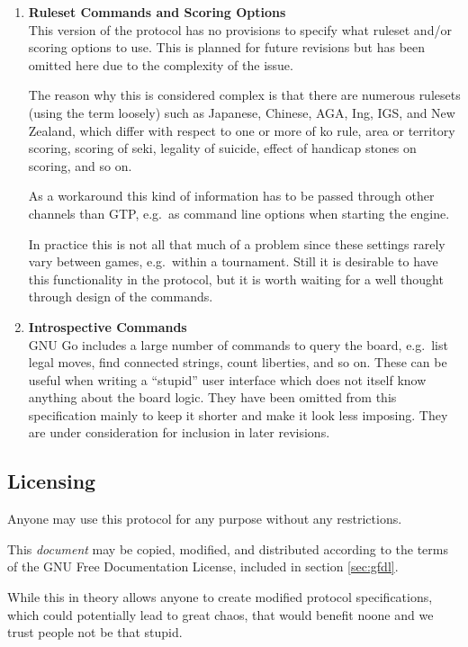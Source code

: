 \documentclass[a4paper]{article}
\begin{document}
\begin{enumerate}
\item \textbf{Ruleset Commands and Scoring Options} \\
  This version of the protocol has no provisions to specify what
  ruleset and/or scoring options to use. This is planned for future
  revisions but has been omitted here due to the complexity of the
  issue.

  The reason why this is considered complex is that there are numerous
  rulesets (using the term loosely) such as Japanese, Chinese, AGA,
  Ing, IGS, and New Zealand, which differ with respect to one or more
  of ko rule, area or territory scoring, scoring of seki, legality of
  suicide, effect of handicap stones on scoring, and so on.
  
  As a workaround this kind of information has to be passed through
  other channels than GTP, e.g.\ as command line options when starting
  the engine.

  In practice this is not all that much of a problem since these
  settings rarely vary between games, e.g.\ within a tournament. Still
  it is desirable to have this functionality in the protocol, but it
  is worth waiting for a well thought through design of the commands.

\item \textbf{Introspective Commands} \\
  GNU Go includes a large number of commands to query the board, e.g.\ 
  list legal moves, find connected strings, count liberties, and so
  on. These can be useful when writing a ``stupid'' user interface
  which does not itself know anything about the board logic. They have
  been omitted from this specification mainly to keep it shorter and
  make it look less imposing. They are under consideration for
  inclusion in later revisions.
\end{enumerate}


\subsection{Licensing}
Anyone may use this protocol for any purpose without any restrictions.

This \emph{document} may be copied, modified, and distributed
according to the terms of the GNU Free Documentation License, included
in section \ref{sec:gfdl}.

While this in theory allows anyone to create modified protocol
specifications, which could potentially lead to great chaos, that
would benefit noone and we trust people not be that stupid.
\end{document}
